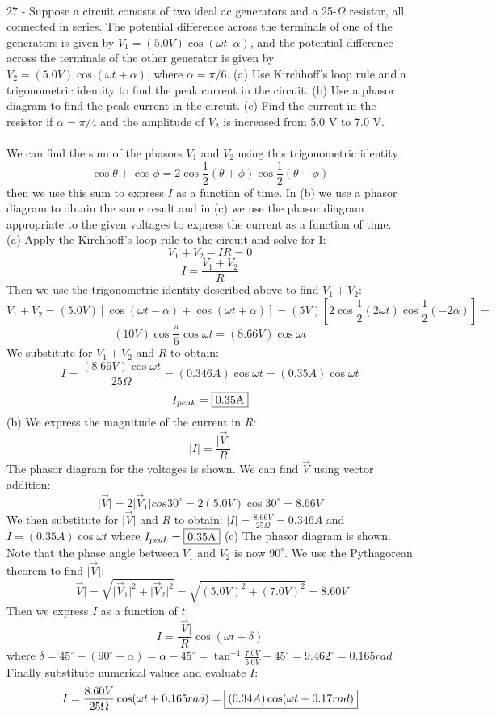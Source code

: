 \documentclass{report}
\begin{document}
\paragraph{}
27 - Suppose a circuit consists of two ideal ac generators and a 25-$\Omega$ resistor, all connected in series. The potential difference across the terminals of one of the generators is given by $V_1 = (5.0 V) \cos( \omega t – \alpha)$, and the potential difference across the terminals of the other generator is given by $V_2 = (5.0 V) \cos( \omega t + \alpha )$, where $\alpha = \pi / 6$. (a) Use Kirchhoff’s loop rule and a trigonometric identity to find the peak current in the circuit. (b) Use a phasor diagram to find the peak current in the circuit. (c) Find the current in the resistor if $\alpha = \pi / 4$ and the amplitude of $V_2$ is increased from 5.0 V to 7.0 V.\\
\\
We can find the sum of the phasors $V_1$ and $V_2$ using this trigonometric identity
$$\cos \theta + \cos \phi = 2 \cos \frac{1}{2}(\theta + \phi) \cos \frac{1}{2}(\theta - \phi)$$
then we use this sum to express $I$ as a function of time. In (b) we use a phasor diagram to obtain the same result and in (c) we use the phasor diagram appropriate to the given voltages to express the current as a function of time.\\
(a) Apply the Kirchhoff's loop rule to the circuit and solve for I:
$$V_1 + V_2 - IR = 0$$
$$I = \frac{V_1 + V_2}{R}$$
Then we use the trigonometric identity described above to find $V_1 + V_2:$
$$V_1 + V_2 = (5.0V)[\cos (\omega t - \alpha ) + \cos (\omega t + \alpha)] = (5V)[2\cos \frac{1}{2}(2\omega t)\cos \frac{1}{2} (-2\alpha)] =$$
$$(10V)\cos \frac{\pi}{6}\cos \omega t = (8.66V)\cos \omega t$$
We substitute for $V_1 + V_2$ and $R$ to obtain:
$$I = \frac{(8.66V)\cos \omega t}{25\Omega} = (0.346A)\cos \omega t = (0.35A)\cos \omega t$$
$$I_{peak} = \fbox{0.35A}$$
(b) We express the magnitude of the current in $R:$
$$\lvert I \rvert = \frac{\lvert \vec{V} \rvert}{R}$$
The phasor diagram for the voltages is shown. We can find $\vec V$ using vector addition:
$$\lvert \vec V \rvert = 2 \lvert \vec V_1 \rvert cos 30^{\circ} = 2(5.0V)\cos 30^{\circ} = 8.66V$$
We then substitute for $\lvert \vec V \rvert$ and $R$ to obtain: $\lvert I \rvert = \frac{8.66V}{25\Omega} = 0.346A$ and $I = (0.35A) \cos \omega t$ where $I_{peak} = \fbox{0.35A}$
(c) The phasor diagram is shown. Note that the phase angle between $V_1$ and $V_2$ is now $90^{\circ}$. We use the Pythagorean theorem to find $\lvert \vec V \rvert$:
$$\lvert \vec V \rvert = \sqrt{\lvert \vec V_1 \rvert ^2 + \lvert \vec V_2 \rvert ^2} = \sqrt{(5.0V)^2 + (7.0V)^2} = 8.60V$$
Then we express $I$ as a function of $t$:
$$I = \frac{\lvert \vec V \rvert}{R}\cos (\omega t + \delta)$$
where $\delta = 45^{\circ} - (90^{\circ} - \alpha) = \alpha - 45^{\circ} = \tan ^{-1} \frac{7.0V}{5.0V} - 45^{\circ} = 9.462^{\circ} = 0.165rad$\\
Finally substitute numerical values and evaluate $I$:
$$I = \frac{8.60V}{25\Omega}\cos (\omega t + 0.165rad) = \fbox{$(0.34A)\cos (\omega t + 0.17rad)$}$$
\end{document}

